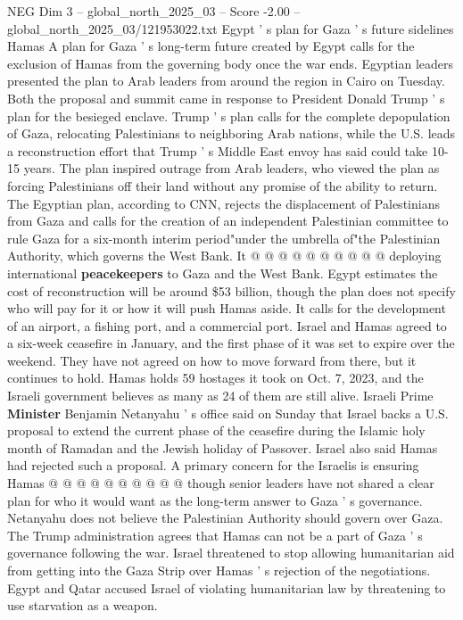 \begin{textsample}{NEG Dim 3 – global\_north\_2025\_03 – Score -2.00 – global\_north\_2025\_03/121953022.txt}  \label{ex:f3_neg_429}
Egypt ' s plan for Gaza ' s future sidelines Hamas A plan for Gaza ' s long-term future created by Egypt calls for the exclusion of Hamas from the governing body once the war ends.
Egyptian leaders presented the plan to Arab leaders from around the region in Cairo on Tuesday.
Both the proposal and summit came in response to President Donald Trump ' s plan for the besieged enclave.
Trump ' s plan calls for the complete depopulation of Gaza, relocating Palestinians to neighboring Arab nations, while the U.S. leads a reconstruction effort that Trump ' s Middle East envoy has said could take 10-15 years.
The plan inspired outrage from Arab leaders, who viewed the plan as forcing Palestinians off their land without any promise of the ability to return.
The Egyptian plan, according to CNN, rejects the displacement of Palestinians from Gaza and calls for the creation of an independent Palestinian committee to rule Gaza for a six-month interim period"under the umbrella of"the Palestinian Authority, which governs the West Bank.
It @ @ @ @ @ @ @ @ @ @ deploying international \textbf{peacekeepers} to Gaza and the West Bank.
Egypt estimates the cost of reconstruction will be around \$53 billion, though the plan does not specify who will pay for it or how it will push Hamas aside.
It calls for the development of an airport, a fishing port, and a commercial port.
Israel and Hamas agreed to a six-week ceasefire in January, and the first phase of it was set to expire over the weekend.
They have not agreed on how to move forward from there, but it continues to hold.
Hamas holds 59 hostages it took on Oct. 7, 2023, and the Israeli government believes as many as 24 of them are still alive.
Israeli Prime \textbf{Minister} Benjamin Netanyahu ' s office said on Sunday that Israel backs a U.S. proposal to extend the current phase of the ceasefire during the Islamic holy month of Ramadan and the Jewish holiday of Passover.
Israel also said Hamas had rejected such a proposal.
A primary concern for the Israelis is ensuring Hamas @ @ @ @ @ @ @ @ @ @ though senior leaders have not shared a clear plan for who it would want as the long-term answer to Gaza ' s governance.
Netanyahu does not believe the Palestinian Authority should govern over Gaza.
The Trump administration agrees that Hamas can not be a part of Gaza ' s governance following the war.
Israel threatened to stop allowing humanitarian aid from getting into the Gaza Strip over Hamas ' s rejection of the negotiations.
Egypt and Qatar accused Israel of violating humanitarian law by threatening to use starvation as a weapon.

\end{textsample}
